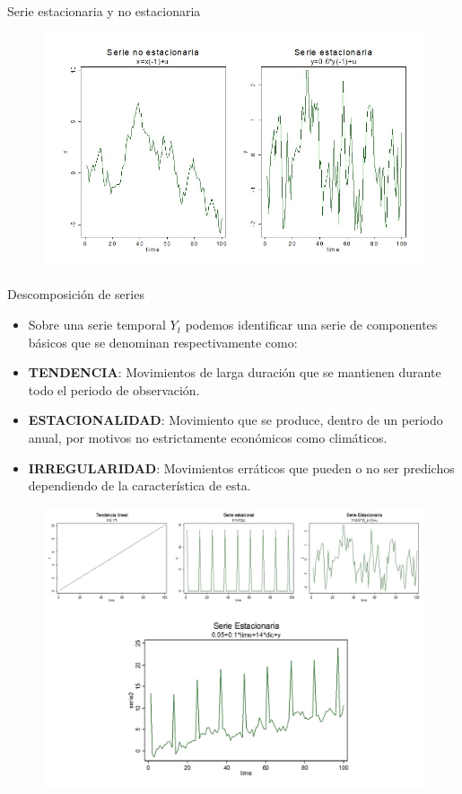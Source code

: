 \begin{frame}{Serie estacionaria y no estacionaria}
	\centering
		\begin{figure}
			\includegraphics[width = 0.9\linewidth]{fig/figure3.jpg}
		\end{figure}
\end{frame}
\begin{frame}{Descomposición de series}
	\begin{itemize}
		\item Sobre una serie temporal \textbf{$Y_t$} podemos identificar una serie de componentes básicos que se denominan respectivamente como:
		\item \textbf{TENDENCIA}: Movimientos de larga duración que se mantienen durante todo el periodo de observación.
		\item \textbf{ESTACIONALIDAD}: Movimiento que se produce, dentro de un periodo anual, por motivos no estrictamente económicos  como climáticos.
		\item \textbf{IRREGULARIDAD}: Movimientos erráticos que pueden o no ser predichos dependiendo de la característica de esta.
	\end{itemize}
\end{frame}
\begin{frame}
	\centering
		\begin{figure}
			\includegraphics[width = 0.9\linewidth]{fig/figure4.jpg}
		\end{figure}
\end{frame}
